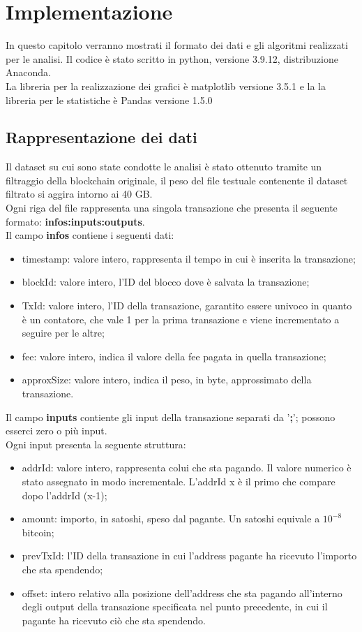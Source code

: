\chapter{Implementazione}
In questo capitolo verranno mostrati il formato dei dati e gli algoritmi realizzati per le analisi.
Il codice è stato scritto in python, versione 3.9.12, distribuzione Anaconda.\\
La libreria per la realizzazione dei grafici è matplotlib versione 3.5.1 e la la libreria per le statistiche è Pandas versione 1.5.0\\
\section{Rappresentazione dei dati}
Il dataset su cui sono state condotte le analisi è stato ottenuto tramite un filtraggio della blockchain originale, il peso del file testuale contenente il dataset filtrato si aggira intorno ai 40 GB.\\
Ogni riga del file rappresenta una singola transazione che presenta il seguente formato:
\textbf{infos:inputs:outputs}.\\ Il campo \textbf{infos} contiene i seguenti dati:
\begin{itemize}
    \item timestamp: valore intero, rappresenta il tempo in cui è inserita la transazione;
    \item blockId: valore intero, l'ID del blocco dove è salvata la transazione;
    \item TxId: valore intero, l'ID della transazione, garantito essere univoco in quanto è un contatore, che vale 1 per la prima transazione e viene incrementato a seguire per le altre;
    \item fee: valore intero, indica il valore della fee pagata in quella transazione;
    \item approxSize: valore intero, indica il peso, in byte, approssimato della transazione.
\end{itemize}
Il campo \textbf{inputs} contiente gli input della transazione separati da '\textbf{;}'; possono esserci zero o più input.\\
Ogni input presenta la seguente struttura:
\begin{itemize}
    \item addrId: valore intero, rappresenta colui che sta pagando. Il valore numerico è stato assegnato in modo incrementale. L'addrId x è il primo che compare dopo l'addrId (x-1);
    \item amount: importo, in satoshi, speso dal pagante. Un satoshi equivale a $10^{-8}$ bitcoin; 
    \item prevTxId: l'ID della transazione in cui l’address pagante ha ricevuto l’importo che sta spendendo;
    \item offset: intero relativo alla posizione dell’address che sta pagando all’interno degli output della transazione specificata nel punto precedente, in cui il pagante ha ricevuto ciò che sta spendendo.
\end{itemize}
